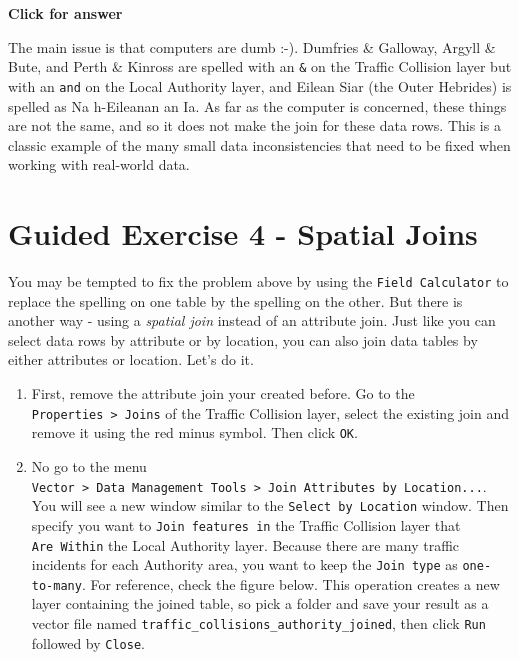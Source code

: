 \documentclass[
  letterpaper,
  DIV=11,
  numbers=noendperiod]{scrreprt}
\begin{document}
\begin{tcolorbox}[enhanced jigsaw, toprule=.15mm, breakable, left=2mm, colframe=quarto-callout-important-color-frame, colback=white, arc=.35mm, leftrule=.75mm, opacityback=0, rightrule=.15mm, bottomrule=.15mm]

\vspace{-3mm}\textbf{Click for answer}\vspace{3mm}

The main issue is that computers are dumb :-). Dumfries \& Galloway,
Argyll \& Bute, and Perth \& Kinross are spelled with an \texttt{\&} on
the Traffic Collision layer but with an \texttt{and} on the Local
Authority layer, and Eilean Siar (the Outer Hebrides) is spelled as Na
h-Eileanan an Ia. As far as the computer is concerned, these things are
not the same, and so it does not make the join for these data rows. This
is a classic example of the many small data inconsistencies that need to
be fixed when working with real-world data.

\end{tcolorbox}

\section{Guided Exercise 4 - Spatial
Joins}\label{guided-exercise-4---spatial-joins}

You may be tempted to fix the problem above by using the
\texttt{Field\ Calculator} to replace the spelling on one table by the
spelling on the other. But there is another way - using a \emph{spatial
join} instead of an attribute join. Just like you can select data rows
by attribute or by location, you can also join data tables by either
attributes or location. Let's do it.

\begin{enumerate}
\def\labelenumi{(\arabic{enumi})}
\setcounter{enumi}{314}
\item
  First, remove the attribute join your created before. Go to the
  \texttt{Properties\ \textgreater{}\ Joins} of the Traffic Collision
  layer, select the existing join and remove it using the red minus
  symbol. Then click \texttt{OK}.
\item
  No go to the menu
  \texttt{Vector\ \textgreater{}\ Data\ Management\ Tools\ \textgreater{}\ Join\ Attributes\ by\ Location...}.
  You will see a new window similar to the \texttt{Select\ by\ Location}
  window. Then specify you want to \texttt{Join\ features\ in} the
  Traffic Collision layer that \texttt{Are\ Within} the Local Authority
  layer. Because there are many traffic incidents for each Authority
  area, you want to keep the \texttt{Join\ type} as
  \texttt{one-to-many}. For reference, check the figure below. This
  operation creates a new layer containing the joined table, so pick a
  folder and save your result as a vector file named
  \texttt{traffic\_collisions\_authority\_joined}, then click
  \texttt{Run} followed by \texttt{Close}.
\end{enumerate}
\end{document}

